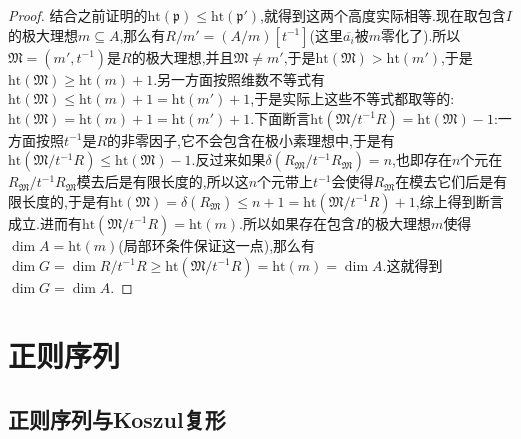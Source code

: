 \begin{enumerate}
\begin{proof}
        结合之前证明的$\mathrm{ht}(\mathfrak{p})\le\mathrm{ht}(\mathfrak{p}')$,就得到这两个高度实际相等.现在取包含$I$的极大理想$m\subseteq A$,那么有$R/m'=(A/m)[t^{-1}]$(这里$\overline{a_i}$被$m$零化了).所以$\mathfrak{M}=(m',t^{-1})$是$R$的极大理想,并且$\mathfrak{M}\not=m'$,于是$\mathrm{ht}(\mathfrak{M})>\mathrm{ht}(m')$,于是$\mathrm{ht}(\mathfrak{M})\ge\mathrm{ht}(m)+1$.另一方面按照维数不等式有$\mathrm{ht}(\mathfrak{M})\le\mathrm{ht}(m)+1=\mathrm{ht}(m')+1$,于是实际上这些不等式都取等的:$\mathrm{ht}(\mathfrak{M})=\mathrm{ht}(m)+1=\mathrm{ht}(m')+1$.下面断言$\mathrm{ht}(\mathfrak{M}/t^{-1}R)=\mathrm{ht}(\mathfrak{M})-1$:一方面按照$t^{-1}$是$R$的非零因子,它不会包含在极小素理想中,于是有$\mathrm{ht}(\mathfrak{M}/t^{-1}R)\le\mathrm{ht}(\mathfrak{M})-1$.反过来如果$\delta(R_{\mathfrak{M}}/t^{-1}R_{\mathfrak{M}})=n$,也即存在$n$个元在$R_{\mathfrak{M}}/t^{-1}R_{\mathfrak{M}}$模去后是有限长度的,所以这$n$个元带上$t^{-1}$会使得$R_{\mathfrak{M}}$在模去它们后是有限长度的,于是有$\mathrm{ht}(\mathfrak{M})=\delta(R_{\mathfrak{M}})\le n+1=\mathrm{ht}(\mathfrak{M}/t^{-1}R)+1$,综上得到断言成立.进而有$\mathrm{ht}(\mathfrak{M}/t^{-1}R)=\mathrm{ht}(m)$.所以如果存在包含$I$的极大理想$m$使得$\dim A=\mathrm{ht}(m)$(局部环条件保证这一点),那么有$\dim G=\dim R/t^{-1}R\ge\mathrm{ht}(\mathfrak{M}/t^{-1}R)=\mathrm{ht}(m)=\dim A$.这就得到$\dim G=\dim A$.
    \end{proof}
\end{enumerate}
\newpage
\section{正则序列}
\subsection{正则序列与Koszul复形}

